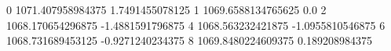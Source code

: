 0 1071.407958984375 1.7491455078125
1 1069.6588134765625 0.0
2 1068.170654296875 -1.4881591796875
4 1068.563232421875 -1.0955810546875
6 1068.731689453125 -0.9271240234375
8 1069.8480224609375 0.189208984375
